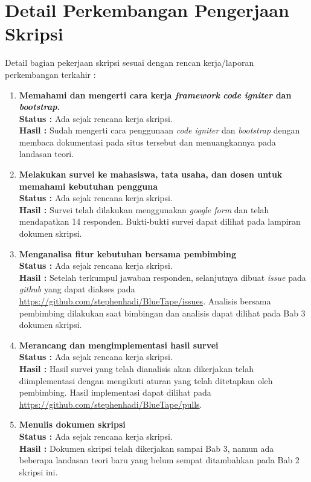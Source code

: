 \documentclass[a4paper,twoside]{article}
\begin{document}
\section{Detail Perkembangan Pengerjaan Skripsi}
Detail bagian pekerjaan skripsi sesuai dengan rencan kerja/laporan perkembangan terkahir :
	\begin{enumerate}
		\item \textbf{Memahami dan mengerti cara kerja \textit{framework} \textit{code igniter} dan \textit{bootstrap}.}\\
		{\bf Status :} Ada sejak rencana kerja skripsi.\\
		{\bf Hasil :} Sudah mengerti cara penggunaan \textit{code igniter} dan \textit{bootstrap} dengan membaca dokumentasi pada situs tersebut dan menuangkannya pada landasan teori.
		
		\item \textbf{Melakukan survei ke mahasiswa, tata usaha, dan dosen untuk memahami kebutuhan pengguna}\\
		{\bf Status :} Ada sejak rencana kerja skripsi.\\
		{\bf Hasil :} Survei telah dilakukan menggunakan \textit{google form} dan telah mendapatkan 14 responden. Bukti-bukti survei dapat dilihat pada lampiran dokumen skripsi.

		\item \textbf{Menganalisa fitur kebutuhan bersama pembimbing }\\
		{\bf Status :} Ada sejak rencana kerja skripsi.\\
		{\bf Hasil :} Setelah terkumpul jawaban responden, selanjutnya dibuat \textit{issue} pada \textit{github} yang dapat diakses pada \url{https://github.com/stephenhadi/BlueTape/issues}. Analisis bersama pembimbing dilakukan saat bimbingan dan analisis dapat dilihat pada Bab 3 dokumen skripsi.

		\item \textbf{Merancang dan mengimplementasi hasil survei}\\
		{\bf Status :} Ada sejak rencana kerja skripsi.\\
		{\bf Hasil :} Hasil survei yang telah dianalisis akan dikerjakan telah diimplementasi dengan mengikuti aturan yang telah ditetapkan oleh pembimbing. Hasil implementasi dapat dilihat pada \url{https://github.com/stephenhadi/BlueTape/pulls}.		
		
		\item \textbf{Menulis dokumen skripsi}\\
		{\bf Status :} Ada sejak rencana kerja skripsi.\\
		{\bf Hasil :} Dokumen skripsi telah dikerjakan sampai Bab 3, namun ada beberapa landasan teori baru yang belum sempat ditambahkan pada Bab 2 skripsi ini.		

	\end{enumerate}
\end{document}
